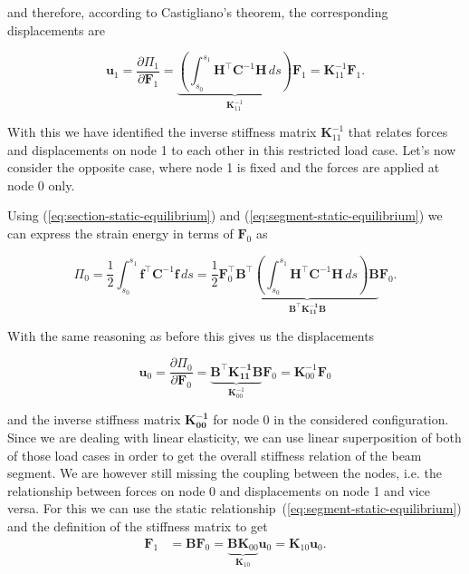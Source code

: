 and therefore, according to Castigliano's theorem, the corresponding displacements are

\begin{equation}
\boldsymbol{u}_{1} = \frac{\partial \Pi_1}{\partial \boldsymbol{F}_1} = \underbrace{\left(\int_{s_0}^{s_1} \boldsymbol{H}^\intercal\boldsymbol{C}^{-1}\boldsymbol{H}\,ds\right)}_{\boldsymbol{K}_{11}^{-1}}\boldsymbol{F}_1 = \boldsymbol{K}_{11}^{-1}\boldsymbol{F}_1.
\end{equation}

With this we have identified the inverse stiffness matrix $\boldsymbol{K}_{11}^{-1}$ that relates forces and displacements on node 1 to each other in this restricted load case.
Let's now consider the opposite case, where node 1 is fixed and the forces are applied at node 0 only.

Using (\ref{eq:section-static-equilibrium}) and (\ref{eq:segment-static-equilibrium}) we can express the strain energy in terms of $\boldsymbol{F}_0$ as

\begin{equation}
\Pi_0 = \frac{1}{2}\int_{s_0}^{s_1} \boldsymbol{f}^\intercal\boldsymbol{C}^{-1}\boldsymbol{f}\,ds = \frac{1}{2}\boldsymbol{F}_0^\intercal\underbrace{\boldsymbol{B}^\intercal\left(\int_{s_0}^{s_1} \boldsymbol{H}^\intercal\boldsymbol{C}^{-1}\boldsymbol{H}\,ds\right)\boldsymbol{B}}_{\boldsymbol{B}^\intercal\boldsymbol{K_{11}^{-1}\boldsymbol{B}}}\boldsymbol{F}_0.
\end{equation}

With the same reasoning as before this gives us the displacements

\begin{equation}
\boldsymbol{u}_{0} = \frac{\partial \Pi_0}{\partial \boldsymbol{F}_0} = \underbrace{\boldsymbol{B}^\intercal\boldsymbol{K_{11}^{-1}\boldsymbol{B}}}_{\boldsymbol{K}_{00}^{-1}}\boldsymbol{F}_0 = \boldsymbol{K}_{00}^{-1}\boldsymbol{F}_0
\end{equation}

and the inverse stiffness matrix $\boldsymbol{\boldsymbol{K}_{00}^{-1}}$ for node 0 in the considered configuration.
Since we are dealing with linear elasticity, we can use linear superposition of both of those load cases in order to get the overall stiffness relation of the beam segment.
We are however still missing the coupling between the nodes, i.e. the relationship between forces on node 0 and displacements on node 1 and vice versa.
For this we can use the static relationship~(\ref{eq:segment-static-equilibrium}) and the definition of the stiffness matrix to get
%
\begin{align}
\boldsymbol{F}_1 &= \boldsymbol{B}\boldsymbol{F}_0 = \underbrace{\boldsymbol{B}\boldsymbol{K}_{00}}_{\boldsymbol{K}_{10}}\boldsymbol{u}_0 = \boldsymbol{K}_{10}\boldsymbol{u}_0.
\end{align}

